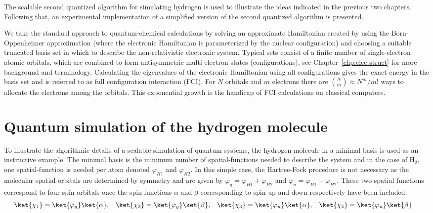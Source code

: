 \documentclass[11pt,oneside,final]{huthesis}%
\begin{document}
The scalable second quantized algorithm for simulating hydrogen is used to illustrate the ideas indicated in the previous two chapters. Following that, an experimental implementation of a simplified version of the second quantized  algorithm is presented. 

We take the standard approach to quantum-chemical calculations by solving an approximate 
Hamiltonian created by using the Born-Oppenheimer approximation (where the electronic 
Hamiltonian is parameterized by the nuclear configuration) and choosing a suitable truncated 
basis set in which to describe the non-relativistic electronic system. Typical sets consist of a 
finite number of single-electron atomic orbitals, which are combined to form antisymmetric multi-electron 
states (configurations), see Chapter~\ref{chp:elec-struct} for more background and terminology. 
Calculating the eigenvalues of 
the electronic Hamiltonian using all configurations gives the exact energy in the basis set and is 
referred to as full configuration interaction (FCI). For $N$ orbitals and $m$ electrons there are 
$\binom{N}{m}\approx N^{m}/m!$ ways to allocate the electrons among the orbitals. This 
exponential growth is the handicap of FCI calculations on classical computers.

\section{Quantum simulation of the hydrogen molecule}\label{sec:H2}

To illustrate the algorithmic details of a scalable simulation of quantum systems, the hydrogen molecule in a minimal basis is used as an instructive example. The minimal basis is the minimum number of spatial-functions needed to describe the system and in the case of H$_2$, one spatial-function is needed per atom denoted $\varphi_{H1}$ and $\varphi_{H2}$.  In this simple case, the Hartree-Fock procedure is not necessary as the molecular spatial-orbitals are determined by symmetry and are given by $\varphi_{g}=\varphi_{H1}+\varphi_{H2}$ and $\varphi_{u}=\varphi_{H1}-\varphi_{H2}$. These two spatial functions correspond to four spin-orbitals once the spin-functions $\alpha$ and $ \beta$ corresponding to spin up and down respectively have been included.  
\begin{align}
\ket{\chi_1}&=\ket{\varphi_g}\ket{\alpha},&\ket{\chi_2}&=\ket{\varphi_g}\ket{\beta},&\ket{\chi_3}&=\ket{\varphi_u}\ket{\alpha},&
\ket{\chi_4}&=\ket{\varphi_u}\ket{\beta}
	\label{eq:spinorbs}
\end{align}
\end{document}
